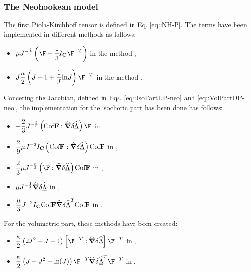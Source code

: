 \subsubsection{The Neohookean model} The first Piola-Kirchhoff tensor
is defined in Eq. \eqref{eq::NH-P}. The terms have been implemented in
different methods as follows:
\begin{itemize}
  \item $\displaystyle \mu
J^{-\frac{2}{3}}\left(\F-\frac{1}{3}I_{\C}\F^{-T}\right)$ in the
method ,
  \item $\displaystyle
J\frac{\kappa}{2}\left(J-1+\frac{1}{J}\text{ln}J\right)\F^{-T}$ in the
method .
\end{itemize} Concering the Jacobian, defined in
Eqs. \eqref{eq::IsoPartDP-neo} and \eqref{eq::VolPartDP-neo}, the
implementation for the isochoric part has been done has follows:
\begin{itemize}
  \item $\displaystyle
-\frac{2}{3}J^{-\frac{5}{3}}\left(\cofF:\GradSpost\right)\F$ in
,
  \item $\displaystyle \frac{2}{9}\mu
J^{-2}I_{\textbf{C}}\left(\text{Cof}\textbf{F}:\widehat{\boldsymbol{\nabla}}\delta\widehat{\underline{\Lambda}}\right)\text{Cof}\textbf{F}$ in
,
  \item $\displaystyle \frac{2}{3}\mu
J^{-\frac{5}{3}}\left(\F:\GradSpost\right)\cofF$ in
,
  \item $\displaystyle \mu J^{-\frac{2}{3}}\widehat{\boldsymbol{\nabla}}\delta\widehat{\underline{\Lambda}}$ in
,
  \item $\displaystyle
\frac{\mu}{3}J^{-2}I_{\textbf{C}}\text{Cof}\textbf{F}\widehat{\boldsymbol{\nabla}}\delta\widehat{\underline{\Lambda}}^T\text{Cof}\textbf{F}$ in
.
\end{itemize} For the volumetric part, these methods have been
created:
\begin{itemize}
  \item $\displaystyle
\frac{\kappa}{2}\left(2J^2-J+1\right)\left[\F^{-T}:\GradSpost\right]\F^{-T}$
in ,
  \item $\displaystyle
\frac{\kappa}{2}\left(J-J^2-\text{ln}(J)\right)\F^{-T}\GradSpost^T\F^{-T}$
in .
\end{itemize}


